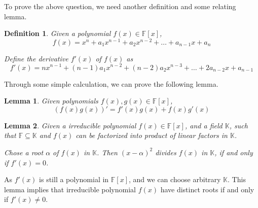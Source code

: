 \documentclass{article}
\newtheorem{definition}{Definition}[section]
\newtheorem{lemma}{Lemma}[section]
\begin{document}
    To prove the above question, we need another definition and some relating lemma.

    \begin{definition}
        Given a polynomial $ f(x) \in \mathbb{F}[x] $,
        \begin{equation*}
            f(x) = x^{n} + a_{1}x^{n-1} + a_{2}x^{n-2} + \dots + a_{n-1}x + a_{n}
        \end{equation*}

        Define the derivative $ f'(x) $ of $ f(x) $ as
        \begin{equation*}
            f'(x) = n x^{n-1} + (n-1)a_{1}x^{n-2} + (n-2)a_{2}x^{n-3} + \dots + 2a_{n-2}x + a_{n-1}
        \end{equation*}
    \end{definition}

    Through some simple calculation, we can prove the following lemma.
    \begin{lemma}
        Given polynomials $ f(x), g(x) \in \mathbb{F}[x] $,
        \begin{equation*}
            (f(x)g(x))' = f'(x)g(x) + f(x)g'(x)
        \end{equation*}
    \end{lemma}

    \begin{lemma}
        Given a irreducible polynomial $ f(x) \in \mathbb{F}[x] $,
        and a field $ \mathbb{K} $,
        such that $ \mathbb{F} \subseteq \mathbb{K} $
        and $ f(x) $ can be factorized into product of linear factors in $ \mathbb{K} $.

        Chose a root $ \alpha $ of $ f(x) $ in $ \mathbb{K} $.
        Then $ (x-\alpha)^2 $ divides $ f(x) $ in $ \mathbb{K} $,
        if and only if $ f'(x) = 0 $.
    \end{lemma}

    As $ f'(x) $ is still a polynomial in $ \mathbb{F}[x] $,
    and we can choose arbitrary $ \mathbb{K} $.
    This lemma implies that irreducible polynomial $ f(x) $ have distinct roots
    if and only if $ f'(x) \neq 0 $.
\end{document}
